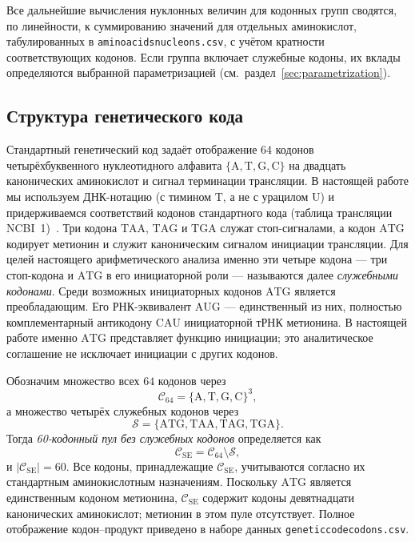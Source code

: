 \documentclass[11pt,a4paper]{article}
\renewcommand{\_}{\origunderscore\allowbreak}
\begin{document}
Все дальнейшие вычисления нуклонных величин для кодонных групп
сводятся, по линейности, к суммированию значений для отдельных
аминокислот, табулированных в
\texttt{amino\_acids\_nucleons.csv}, с учётом кратности
соответствующих кодонов. Если группа включает служебные кодоны, их
вклады определяются выбранной параметризацией
(см.\ раздел~\ref{sec:parametrization}).

\subsection{Структура генетического кода}
\label{sec:genetic-code}

Стандартный генетический код задаёт отображение $64$ кодонов
четырёхбуквенного нуклеотидного алфавита
$\{\mathrm{A}, \mathrm{T}, \mathrm{G}, \mathrm{C}\}$ на двадцать
канонических аминокислот и сигнал терминации трансляции. В настоящей
работе мы используем ДНК-нотацию (с тимином $\mathrm{T}$, а не с
урацилом $\mathrm{U}$) и придерживаемся соответствий кодонов
стандартного кода (таблица трансляции
NCBI~1)~\cite{ncbi2024geneticcodes}. Три кодона $\mathrm{TAA}$,
$\mathrm{TAG}$ и $\mathrm{TGA}$ служат стоп-сигналами, а кодон
$\mathrm{ATG}$ кодирует метионин и служит каноническим сигналом
инициации трансляции. Для целей настоящего арифметического анализа
именно эти четыре кодона --- три стоп-кодона и $\mathrm{ATG}$ в его
инициаторной роли --- называются далее \emph{служебными кодонами}.
Среди возможных инициаторных кодонов $\mathrm{ATG}$ является
преобладающим. Его РНК-эквивалент $\mathrm{AUG}$ --- единственный
из них, полностью комплементарный антикодону $\mathrm{CAU}$
инициаторной тРНК метионина. В настоящей работе именно
$\mathrm{ATG}$ представляет функцию инициации; это аналитическое
соглашение не исключает инициации с других кодонов.

Обозначим множество всех $64$ кодонов через
\[
\mathcal{C}_{64}
=
\{\mathrm{A},\mathrm{T},\mathrm{G},\mathrm{C}\}^{3},
\]
а множество четырёх служебных кодонов через
\[
\mathcal{S}
=
\{\mathrm{ATG},\mathrm{TAA},\mathrm{TAG},\mathrm{TGA}\}.
\]
Тогда \emph{60-кодонный пул без служебных кодонов} определяется как
\[
\mathcal{C}_{\mathrm{SE}}
=
\mathcal{C}_{64}\setminus\mathcal{S},
\]
и $|\mathcal{C}_{\mathrm{SE}}|=60$. Все кодоны, принадлежащие
$\mathcal{C}_{\mathrm{SE}}$, учитываются согласно их стандартным
аминокислотным назначениям. Поскольку $\mathrm{ATG}$ является единственным кодоном метионина,
$\mathcal{C}_{\mathrm{SE}}$ содержит кодоны девятнадцати канонических
аминокислот; метионин в этом пуле отсутствует. Полное отображение кодон--продукт
приведено в наборе данных
\texttt{genetic\_code\_codons.csv}.
\end{document}
